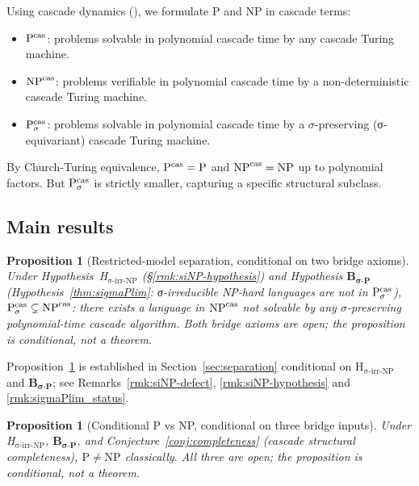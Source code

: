 \documentclass[11pt, a4paper]{amsart}
\newtheorem{proposition}[theorem]{Proposition}
\theoremstyle{definition}
\begin{document}
Using cascade dynamics (\cite{CascadeDynamics}), we formulate P and NP
in cascade terms:
\begin{itemize}
\item $\mathrm{P}^{\rm cas}$: problems solvable in polynomial cascade
    time by any cascade Turing machine.
\item $\mathrm{NP}^{\rm cas}$: problems verifiable in polynomial cascade
    time by a non-deterministic cascade Turing machine.
\item $\mathrm{P}_{\sigma}^{\rm cas}$: problems solvable in polynomial cascade
    time by a $\sigma$-preserving (σ-equivariant) cascade Turing machine.
\end{itemize}

By Church-Turing equivalence, $\mathrm{P}^{\rm cas} = \mathrm{P}$ and
$\mathrm{NP}^{\rm cas} = \mathrm{NP}$ up to polynomial factors. But
$\mathrm{P}_{\sigma}^{\rm cas}$ is strictly smaller, capturing a specific
structural subclass.

\subsection{Main results}

\begin{proposition}[Restricted-model separation, conditional on two bridge axioms]\label{thm:separation}
Under Hypothesis~\textup{H$_{\text{σ-irr-NP}}$}
(\S\ref{rmk:siNP-hypothesis})
\emph{and} Hypothesis $\mathbf{B_{\sigma\text{-}P}}$
(Hypothesis~\ref{thm:sigmaPlim}: σ-irreducible NP-hard languages
are not in $\mathrm{P}_\sigma^{\rm cas}$),
$\mathrm{P}_{\sigma}^{\rm cas} \subsetneq \mathrm{NP}^{\rm cas}$:
there exists a language in $\mathrm{NP}^{\rm cas}$ not solvable by
any $\sigma$-preserving polynomial-time cascade algorithm.
\emph{Both bridge axioms are open; the proposition is conditional,
not a theorem.}
\end{proposition}

Proposition~\ref{thm:separation} is established in
Section~\ref{sec:separation} conditional on
H$_{\text{σ-irr-NP}}$ and $\mathbf{B_{\sigma\text{-}P}}$;
see Remarks~\ref{rmk:siNP-defect}, \ref{rmk:siNP-hypothesis} and
\ref{rmk:sigmaPlim_status}.

\begin{proposition}[Conditional P vs NP, conditional on three bridge inputs]\label{thm:conditional}
Under H$_{\text{σ-irr-NP}}$, $\mathbf{B_{\sigma\text{-}P}}$, and
Conjecture~\ref{conj:completeness} (cascade structural
completeness), $\mathrm{P} \neq \mathrm{NP}$ classically.
\emph{All three are open; the proposition is conditional, not a
theorem.}
\end{proposition}
\end{document}
